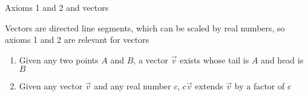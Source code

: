 \documentclass[bigger]{beamer}
\begin{document}
\begin{frame}[label=sec-10]{Axioms 1 and 2 and vectors}
\begin{block}{Vectors are \alert{directed line segments}, which can be \alert{scaled by real numbers}, so axioms 1 and 2 are relevant for vectors}
\begin{enumerate}
\item Given any two points $A$ and $B$, a vector $\vec{v}$ exists whose tail is $A$ and head is $B$

\item Given any vector $\vec{v}$ and any real number $c$, $c\vec{v}$ extends $\vec{v}$ by a factor of $c$
\end{enumerate}

\begin{center}
\end{center}
\end{block}
\end{frame}
\end{document}
